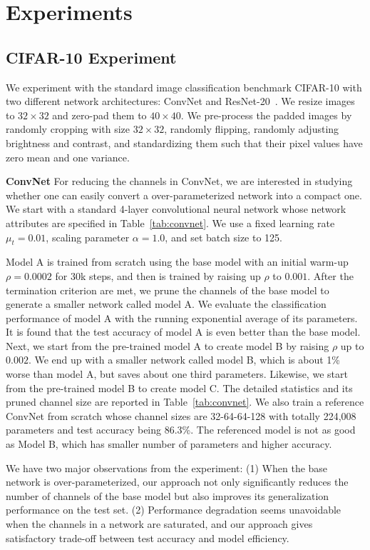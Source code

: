 \documentclass{article} %
\begin{document}
\section{Experiments}
\subsection{CIFAR-10 Experiment}\label{sec:cifar10}
We experiment with the standard image classification benchmark CIFAR-10 with two different network 
architectures: ConvNet and ResNet-20~\citep{he2016deep}. 
We resize images to $32 \times 32$ and zero-pad them to $40 \times 40$.
We pre-process the padded images by randomly cropping with size $32 \times 32$, randomly flipping, 
randomly adjusting brightness and contrast, and standardizing them such that their pixel values
have zero mean and one variance.

\textbf{ConvNet} For reducing the channels in ConvNet, we are interested in studying whether one 
can easily convert a over-parameterized network into a compact one. We start with
a standard 4-layer convolutional neural network whose network attributes are specified in
Table~\ref{tab:convnet}. We use a fixed learning rate $\mu_t=0.01$, scaling parameter $\alpha = 1.0$, 
and set batch size to 125. 

Model A is trained from scratch using the base model with an initial warm-up $\rho=0.0002$ for 30k steps,
and then is trained by raising up $\rho$ to $0.001$. After the termination criterion are met, 
we prune the channels of the base model to generate a smaller network called model A. 
We evaluate the classification performance of model A with
the running exponential average of its parameters. It is found that the test accuracy of model A
is even better than the base model. 
Next, we start from the pre-trained model A to create model B by raising $\rho$ up to $0.002$. 
We end up with a smaller network called model B, which is about 1\% worse than model A,
but saves about one third parameters. Likewise, we start from the pre-trained model B to create model C.
The detailed statistics and its pruned channel size are reported in Table~\ref{tab:convnet}. 
We also train a reference ConvNet from scratch whose channel sizes are 32-64-64-128 with totally 224,008 parameters
and test accuracy being 86.3\%. The referenced model is not as good as Model B, which has smaller number
of parameters and higher accuracy. 

We have two major observations from the experiment: (1) When the base network is over-parameterized, our 
approach not only significantly reduces the number of channels of the base model but also improves
its generalization performance on the test set. (2) Performance degradation seems unavoidable when
the channels in a network are saturated, and our approach gives satisfactory trade-off between test accuracy
and model efficiency. 
\end{document}
